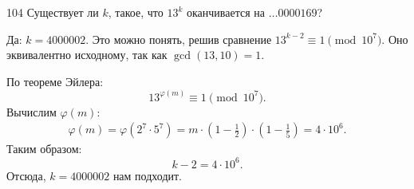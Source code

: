 \begin{task}{104}
Существует ли $k$, такое, что $13^k$ оканчивается на $\dots0000169$?
\end{task}

\begin{solution}
Да: $k = 4000002$. Это можно понять, решив сравнение $13^{k-2} \equiv 1 \pmod{10^7}$. Оно эквивалентно исходному, так как $\operatorname{gcd}(13, 10) = 1$.\par
По теореме Эйлера:
\begin{equation*}
    13^{\varphi(m)}\equiv 1 \pmod{10^7}.
\end{equation*}
Вычислим $\varphi(m)$:
\begin{gather*}
    \varphi(m) = \varphi(2^7\cdot5^7) = m\cdot\left(1-\frac{1}{2} \right) \cdot\left(1-\frac{1}{5} \right)=4\cdot10^6.
\end{gather*}
Таким образом:
\begin{equation*}
    k - 2 = 4\cdot10^6.
\end{equation*}
Отсюда, $k = 4000002$ нам подходит.
\end{solution}